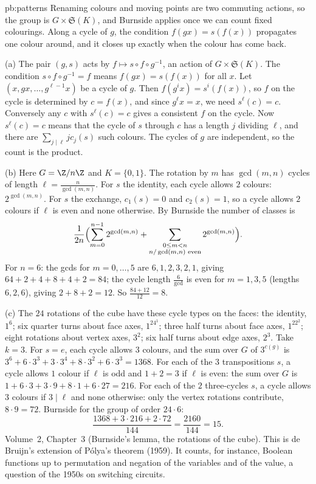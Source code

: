 \begin{solution}{pb:patterns}
\idea Renaming colours and moving points are two commuting actions, so the group is $G\times\mathfrak S(K)$, and Burnside
applies once we can count fixed colourings. Along a cycle of $g$, the condition $f(gx)=s(f(x))$ propagates one colour around,
and it closes up exactly when the colour has come back.

\writeup (a) The pair $(g,s)$ acts by $f\mapsto s\circ f\circ g^{-1}$, an action of $G\times\mathfrak S(K)$. The condition
$s\circ f\circ g^{-1}=f$ means $f(gx)=s(f(x))$ for all $x$. Let $(x,gx,\dots,g^{\ell-1}x)$ be a cycle of $g$. Then
$f(g^ix)=s^i(f(x))$, so $f$ on the cycle is determined by $c=f(x)$, and since $g^\ell x=x$, we need $s^\ell(c)=c$. Conversely
any $c$ with $s^\ell(c)=c$ gives a consistent $f$ on the cycle. Now $s^\ell(c)=c$ means that the cycle of $s$ through $c$ has
a length $j$ dividing $\ell$, and there are $\sum_{j\mid\ell}jc_j(s)$ such colours. The cycles of $g$ are independent, so the
count is the product.

(b) Here $G=\Z/n\Z$ and $K=\{0,1\}$. The rotation by $m$ has $\gcd(m,n)$ cycles of length $\ell=\frac n{\gcd(m,n)}$. For $s$
the identity, each cycle allows $2$ colours: $2^{\gcd(m,n)}$. For $s$ the exchange, $c_1(s)=0$ and $c_2(s)=1$, so a cycle allows
$2$ colours if $\ell$ is even and none otherwise. By Burnside the number of classes is
\[
\frac1{2n}\Bigl(\sum_{m=0}^{n-1}2^{\gcd(m,n)}+\sum_{\substack{0\le m<n\\ n/\gcd(m,n)\text{ even}}}2^{\gcd(m,n)}\Bigr).
\]
For $n=6$: the gcds for $m=0,\dots,5$ are $6,1,2,3,2,1$, giving $64+2+4+8+4+2=84$; the cycle length $\frac6{\gcd}$ is even for
$m=1,3,5$ (lengths $6,2,6$), giving $2+8+2=12$. So $\frac{84+12}{12}=8$.

(c) The $24$ rotations of the cube have these cycle types on the faces: the identity, $1^6$; six quarter turns about face axes,
$1^24^1$; three half turns about face axes, $1^22^2$; eight rotations about vertex axes, $3^2$; six half turns about edge axes,
$2^3$. Take $k=3$. For $s=e$, each cycle allows $3$ colours, and the sum over $G$ of $3^{c(g)}$ is
$3^6+6\cdot3^3+3\cdot3^4+8\cdot3^2+6\cdot3^3=1368$. For each of the $3$ transpositions $s$, a cycle allows $1$ colour if $\ell$ is
odd and $1+2=3$ if $\ell$ is even: the sum over $G$ is $1+6\cdot3+3\cdot9+8\cdot1+6\cdot27=216$. For each of the $2$ three-cycles
$s$, a cycle allows $3$ colours if $3\mid\ell$ and none otherwise: only the vertex rotations contribute, $8\cdot9=72$. Burnside
for the group of order $24\cdot6$:
\[
\frac{1368+3\cdot216+2\cdot72}{144}=\frac{2160}{144}=15.
\]
\tools Volume~2, Chapter~3 (Burnside's lemma, the rotations of the cube).
\leads This is de Bruijn's extension of Pólya's theorem (1959). It counts, for instance, Boolean functions up to permutation
and negation of the variables and of the value, a question of the 1950s on switching circuits.
\end{solution}


